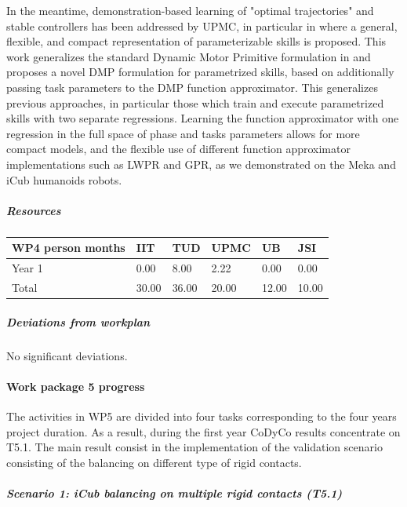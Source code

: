 \documentclass[12pt,a4paper,twoside]{article}
\begin{document}
In the meantime, demonstration-based learning of "optimal trajectories" and stable controllers has been addressed by UPMC, in particular in \cite{stulp2013} where a general, flexible, and compact representation of parameterizable skills is proposed. This work generalizes the standard Dynamic Motor Primitive formulation in \cite{ijspeert2013} and proposes a novel DMP formulation for parametrized skills, based on additionally passing task parameters to the DMP function approximator. This generalizes previous approaches, in particular those which train and execute parametrized skills with two separate regressions. Learning the function approximator with one regression in the full space of phase and tasks parameters allows for more compact models, and the flexible use of different function approximator implementations such as LWPR and GPR, as we demonstrated on the Meka and iCub humanoids robots.


\subparagraph{Resources}

\begin{center}
\begin{tabular}{|C{1.5cm}|C{1.5cm}|C{1.5cm}|C{2cm}|C{2cm}|C{2cm}|}
\hline
\footnotesize \textbf{WP4 person months}& \footnotesize \textbf{IIT}&\footnotesize \textbf{TUD}&\footnotesize \textbf{UPMC}& \footnotesize \textbf{UB} &\footnotesize \textbf{JSI}\\ \hline
\footnotesize Year 1 &  0.00 & 8.00 & 2.22 & 0.00 & 0.00      \\  \hline
\footnotesize Total &  30.00 & 36.00 & 20.00 & 12.00 & 10.00 \\ \hline
\end{tabular}
\end{center}

\subparagraph{Deviations from workplan} 

No significant deviations. 

\paragraph{Work package 5 progress}

The activities in WP5 are divided into four tasks corresponding to the four years project duration. As a result, during the first year CoDyCo results concentrate on T5.1. The main result consist in the implementation of the validation scenario consisting of the balancing on different type of rigid contacts.

\subparagraph{Scenario 1: iCub balancing on multiple rigid contacts (T5.1)}
\end{document}
